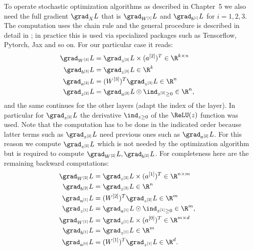 To operate stochastic optimization algorithms as described in Chapter~5 we also need the full gradient $\grad_X L$ that is $\grad_{W^{[i]}} L$ and $\grad_{b^{[i]}} L$ for $i = 1, 2, 3$. The computation uses the chain rule and the general procedure is described in detail in \cite[Chapter 3]{turinici14}; in practice this is used via specialized packages such as Tensorflow, Pytorch, Jax and so on. For our particular case it reads:
\begin{align}
  \grad_{W^{[3]}} L &= \grad_{z^{[3]}} L \times (a^{[2]})^T \in \R^{k \times n} \label{eq:ch7-bp-W3} \\
  \grad_{b^{[3]}} L &= \grad_{z^{[3]}} L \in \R^k \label{eq:ch7-bp-b3} \\
  \grad_{a^{[2]}} L &= (W^{[3]})^T \grad_{z^{[3]}} L \in \R^n \label{eq:ch7-bp-a2} \\
  \grad_{z^{[2]}} L &= \grad_{a^{[2]}} L \odot \ind_{z^{[2]} \geq 0} \in \R^n, \label{eq:ch7-bp-z2}
\end{align}
and the same continues for the other layers (adapt the index of the layer). In particular for $\grad_{z^{[2]}} L$ the derivative $\ind_{z \geq 0}$ of the $\ReLU(z)$ function was used. Note that the computation has to be done in the indicated order because latter terms such as $\grad_{z^{[2]}} L$ need previous ones such as $\grad_{a^{[2]}} L$. For this reason we compute $\grad_{z^{[2]}} L$ which is not needed by the optimization algorithm but is required to compute $\grad_{W^{[2]}} L, \grad_{b^{[2]}} L$. For completeness here are the remaining backward computations:
\begin{align}
  \grad_{W^{[2]}} L &= \grad_{z^{[2]}} L \times (a^{[1]})^T \in \R^{n \times m} \label{eq:ch7-bp-W2} \\
  \grad_{b^{[2]}} L &= \grad_{z^{[2]}} L \in \R^n \label{eq:ch7-bp-b2} \\
  \grad_{a^{[1]}} L &= (W^{[2]})^T \grad_{z^{[2]}} L \in \R^m \label{eq:ch7-bp-a1} \\
  \grad_{z^{[1]}} L &= \grad_{a^{[1]}} L \odot \ind_{z^{[1]} \geq 0} \in \R^m, \label{eq:ch7-bp-z1} \\
  \grad_{W^{[1]}} L &= \grad_{z^{[1]}} L \times (a^{[0]})^T \in \R^{m \times d} \label{eq:ch7-bp-W1} \\
  \grad_{b^{[1]}} L &= \grad_{z^{[1]}} L \in \R^m \label{eq:ch7-bp-b1} \\
  \grad_{a^{[0]}} L &= (W^{[1]})^T \grad_{z^{[1]}} L \in \R^d. \label{eq:ch7-bp-a0}
\end{align}

